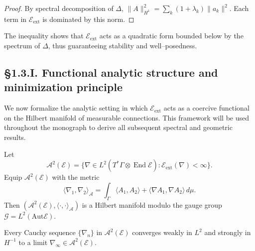 \begin{proof}
By spectral decomposition of $\Delta$, $\|A\|_{H^1}^2=\sum_k (1+\lambda_k)\|a_k\|^2$.  
Each term in $\mathcal E_{\mathrm{ext}}$ is dominated by this norm.
\end{proof}

\begin{remark}[Interpretation]
The inequality shows that $\mathcal E_{\mathrm{ext}}$ acts as a quadratic form bounded below by the spectrum of $\Delta$, thus guaranteeing stability and well–posedness.
\end{remark}


\subsection*{§1.3.I. Functional analytic structure and minimization principle}

We now formalize the analytic setting in which $\mathcal E_{\mathrm{ext}}$ acts as a coercive functional on the Hilbert manifold of measurable connections. This framework will be used throughout the monograph to derive all subsequent spectral and geometric results.

\begin{definition}
Let 
\[
\mathcal A^2(\mathcal E)
 = \{\nabla\in L^2(T^\ast\Gamma\otimes\operatorname{End}\mathcal E)
    : \mathcal E_{\mathrm{ext}}(\nabla)<\infty\}.
\]
Equip $\mathcal A^2(\mathcal E)$ with the metric
\[
\langle \nabla_1,\nabla_2\rangle_{\mathcal A}
 = \int_\Gamma \langle A_1,A_2\rangle + \langle\nabla A_1,\nabla A_2\rangle\,d\mu.
\]
Then $(\mathcal A^2(\mathcal E),\langle\cdot,\cdot\rangle_{\mathcal A})$ is a Hilbert manifold modulo the gauge group $\mathcal G=L^2(\mathrm{Aut}\mathcal E)$.
\end{definition}

\begin{theorem}\label{thm:1.3.complete}
Every Cauchy sequence $\{\nabla_n\}$ in $\mathcal A^2(\mathcal E)$ converges weakly in $L^2$ and strongly in $H^{-1}$ to a limit $\nabla_\infty\in \mathcal A^2(\mathcal E)$.
\end{theorem}

